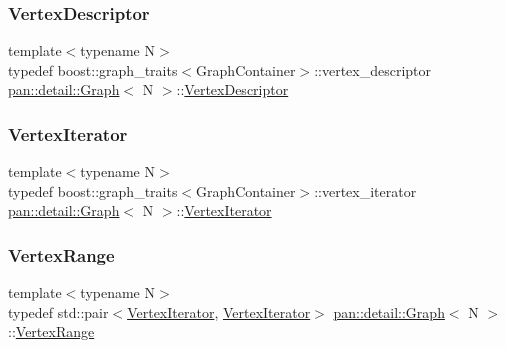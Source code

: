 \mbox{\label{classpan_1_1detail_1_1_graph_a462f566d2f6cb0e51c85c8e9fa5382ab}} 
\subsubsection{\texorpdfstring{Vertex\+Descriptor}{VertexDescriptor}}
{\footnotesize\ttfamily template$<$typename N$>$ \\
typedef boost\+::graph\+\_\+traits$<$Graph\+Container$>$\+::vertex\+\_\+descriptor \hyperlink{classpan_1_1detail_1_1_graph}{pan\+::detail\+::\+Graph}$<$ N $>$\+::\hyperlink{classpan_1_1detail_1_1_graph_a462f566d2f6cb0e51c85c8e9fa5382ab}{Vertex\+Descriptor}}

\mbox{\label{classpan_1_1detail_1_1_graph_a70f42d6ae8c952de395c7fe665182e5c}} 
\subsubsection{\texorpdfstring{Vertex\+Iterator}{VertexIterator}}
{\footnotesize\ttfamily template$<$typename N$>$ \\
typedef boost\+::graph\+\_\+traits$<$Graph\+Container$>$\+::vertex\+\_\+iterator \hyperlink{classpan_1_1detail_1_1_graph}{pan\+::detail\+::\+Graph}$<$ N $>$\+::\hyperlink{classpan_1_1detail_1_1_graph_a70f42d6ae8c952de395c7fe665182e5c}{Vertex\+Iterator}}

\mbox{\label{classpan_1_1detail_1_1_graph_a5b49d7bed177c89e2a5d7cc59df1fb13}} 
\subsubsection{\texorpdfstring{Vertex\+Range}{VertexRange}}
{\footnotesize\ttfamily template$<$typename N$>$ \\
typedef std\+::pair$<$\hyperlink{classpan_1_1detail_1_1_graph_a70f42d6ae8c952de395c7fe665182e5c}{Vertex\+Iterator}, \hyperlink{classpan_1_1detail_1_1_graph_a70f42d6ae8c952de395c7fe665182e5c}{Vertex\+Iterator}$>$ \hyperlink{classpan_1_1detail_1_1_graph}{pan\+::detail\+::\+Graph}$<$ N $>$\+::\hyperlink{classpan_1_1detail_1_1_graph_a5b49d7bed177c89e2a5d7cc59df1fb13}{Vertex\+Range}}




